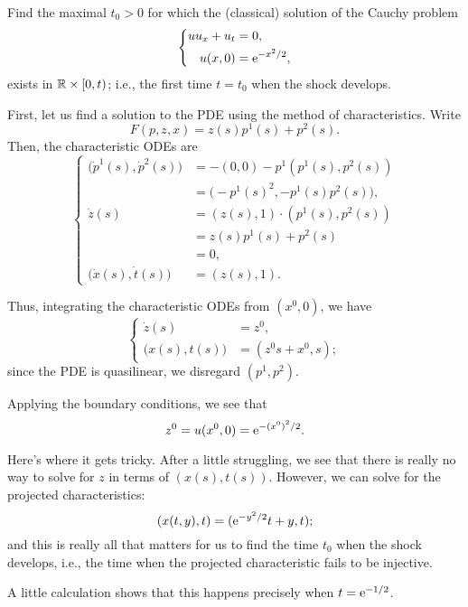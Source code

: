 \begin{problem}
  Find the maximal \(t_0>0\) for which the (classical) solution of the
  Cauchy problem
  \[
    \left\{
      \begin{aligned}
        uu_x+u_t&=0,\\
        u(x,0)&=\mathrm{e}^{-x^2/2},
      \end{aligned}
    \right.
  \]
  exists in \(\mathbb{R}\times[0,t)\); i.e., the first time \(t=t_0\) when the
  shock develops.
\end{problem}
\begin{solution*}
  First, let us find a solution to the PDE using the method of
  characteristics. Write
  \[
    F(p,z,x)=z(s)p^1(s)+p^2(s).
  \]
  Then, the characteristic ODEs are
  \[
    \left\{
      \begin{aligned}
        \bigl(\dot p^1(s),\dot p^2(s)\bigr)
        &=-(0,0)-p^1(p^1(s),p^2(s))\\
        &=\bigl(-p^1(s)^2,-p^1(s)p^2(s)\bigr),\\
        \dot z(s)
        &=(z(s),1)\cdot(p^1(s),p^2(s))\\
        &=z(s)p^1(s)+p^2(s)\\
        &=0,\\
        \bigl(\dot x(s),\dot t(s)\bigr)
        &=(z(s),1).
      \end{aligned}
    \right.
  \]

  Thus, integrating the characteristic ODEs from \((x^0,0)\), we have
  \[
    \left\{
      \begin{aligned}
        \dot z(s)
        &=z^0,\\
        \bigl(x(s),t(s)\bigr)
        &=(z^0s+x^0,s);
      \end{aligned}
    \right.
  \]
  since the PDE is quasilinear, we disregard \((p^1,p^2)\).

  Applying the boundary conditions, we see that
  \[
    z^0=u(x^0,0)=\mathrm{e}^{-{(x^0)}^2/2}.
  \]

  Here's where it gets tricky. After a little struggling, we see that there
  is really no way to solve for \(z\) in terms of \((x(s),t(s))\). However,
  we can solve for the projected characteristics:
  \[
    (x(t,y),t)=(\mathrm{e}^{-y^2/2}t+y,t);
  \]
  and this is really all that matters for us to find the time \(t_0\)  when
  the shock develops, i.e., the time when the projected characteristic
  fails to be injective.

  A little calculation shows that this happens precisely when
  \(t=\mathrm{e}^{-1/2}\).
\end{solution*}

